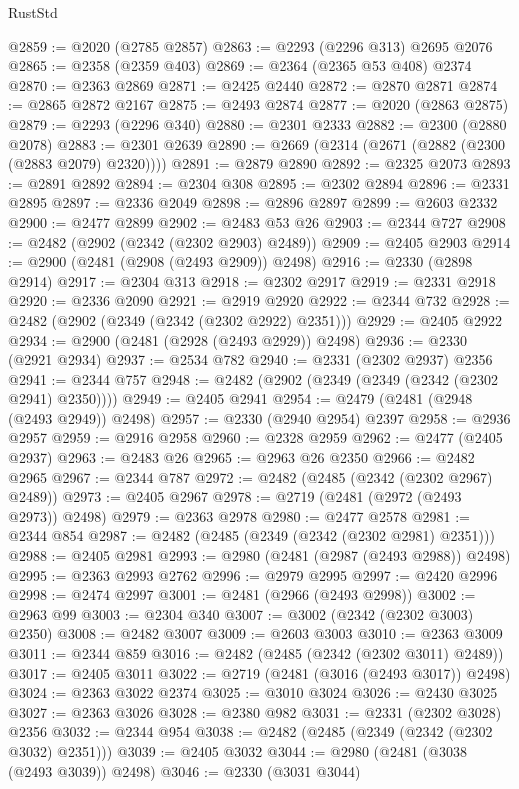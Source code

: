 \begin{lexlean}{RustStd}
\begin{coremodule}
@2859 := @2020 (@2785 @2857)
@2863 := @2293 (@2296 @313) @2695 @2076
@2865 := @2358 (@2359 @403)
@2869 := @2364 (@2365 @53 @408) @2374
@2870 := @2363 @2869
@2871 := @2425 @2440
@2872 := @2870 @2871
@2874 := @2865 @2872 @2167
@2875 := @2493 @2874
@2877 := @2020 (@2863 @2875)
@2879 := @2293 (@2296 @340)
@2880 := @2301 @2333
@2882 := @2300 (@2880 @2078)
@2883 := @2301 @2639
@2890 := @2669 (@2314 (@2671 (@2882 (@2300 (@2883 @2079) @2320))))
@2891 := @2879 @2890
@2892 := @2325 @2073
@2893 := @2891 @2892
@2894 := @2304 @308
@2895 := @2302 @2894
@2896 := @2331 @2895
@2897 := @2336 @2049
@2898 := @2896 @2897
@2899 := @2603 @2332
@2900 := @2477 @2899
@2902 := @2483 @53 @26
@2903 := @2344 @727
@2908 := @2482 (@2902 (@2342 (@2302 @2903) @2489))
@2909 := @2405 @2903
@2914 := @2900 (@2481 (@2908 (@2493 @2909)) @2498)
@2916 := @2330 (@2898 @2914)
@2917 := @2304 @313
@2918 := @2302 @2917
@2919 := @2331 @2918
@2920 := @2336 @2090
@2921 := @2919 @2920
@2922 := @2344 @732
@2928 := @2482 (@2902 (@2349 (@2342 (@2302 @2922) @2351)))
@2929 := @2405 @2922
@2934 := @2900 (@2481 (@2928 (@2493 @2929)) @2498)
@2936 := @2330 (@2921 @2934)
@2937 := @2534 @782
@2940 := @2331 (@2302 @2937) @2356
@2941 := @2344 @757
@2948 := @2482 (@2902 (@2349 (@2349 (@2342 (@2302 @2941) @2350))))
@2949 := @2405 @2941
@2954 := @2479 (@2481 (@2948 (@2493 @2949)) @2498)
@2957 := @2330 (@2940 @2954) @2397
@2958 := @2936 @2957
@2959 := @2916 @2958
@2960 := @2328 @2959
@2962 := @2477 (@2405 @2937)
@2963 := @2483 @26
@2965 := @2963 @26 @2350
@2966 := @2482 @2965
@2967 := @2344 @787
@2972 := @2482 (@2485 (@2342 (@2302 @2967) @2489))
@2973 := @2405 @2967
@2978 := @2719 (@2481 (@2972 (@2493 @2973)) @2498)
@2979 := @2363 @2978
@2980 := @2477 @2578
@2981 := @2344 @854
@2987 := @2482 (@2485 (@2349 (@2342 (@2302 @2981) @2351)))
@2988 := @2405 @2981
@2993 := @2980 (@2481 (@2987 (@2493 @2988)) @2498)
@2995 := @2363 @2993 @2762
@2996 := @2979 @2995
@2997 := @2420 @2996
@2998 := @2474 @2997
@3001 := @2481 (@2966 (@2493 @2998))
@3002 := @2963 @99
@3003 := @2304 @340
@3007 := @3002 (@2342 (@2302 @3003) @2350)
@3008 := @2482 @3007
@3009 := @2603 @3003
@3010 := @2363 @3009
@3011 := @2344 @859
@3016 := @2482 (@2485 (@2342 (@2302 @3011) @2489))
@3017 := @2405 @3011
@3022 := @2719 (@2481 (@3016 (@2493 @3017)) @2498)
@3024 := @2363 @3022 @2374
@3025 := @3010 @3024
@3026 := @2430 @3025
@3027 := @2363 @3026
@3028 := @2380 @982
@3031 := @2331 (@2302 @3028) @2356
@3032 := @2344 @954
@3038 := @2482 (@2485 (@2349 (@2342 (@2302 @3032) @2351)))
@3039 := @2405 @3032
@3044 := @2980 (@2481 (@3038 (@2493 @3039)) @2498)
@3046 := @2330 (@3031 @3044)

\end{coremodule}
\end{lexlean}
